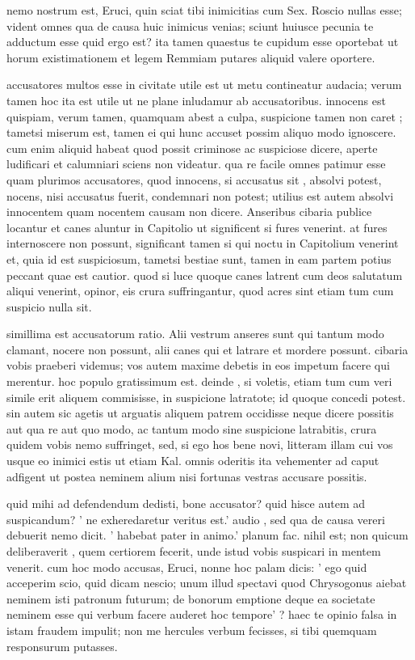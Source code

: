  nemo nostrum est, Eruci, quin sciat tibi inimicitias cum Sex. Roscio nullas esse; vident omnes qua de causa huic inimicus venias; sciunt huiusce pecunia te adductum esse quid ergo est? ita tamen quaestus te cupidum esse oportebat ut horum existimationem et legem Remmiam putares aliquid valere oportere.

 accusatores multos esse in civitate utile est ut metu contineatur audacia; verum tamen hoc ita est utile ut ne plane inludamur ab accusatoribus. innocens est quispiam, verum tamen, quamquam abest a culpa, suspicione tamen non caret ; tametsi miserum est, tamen ei qui hunc accuset possim aliquo modo ignoscere. cum enim aliquid habeat quod possit criminose ac suspiciose dicere, aperte ludificari et calumniari sciens non videatur. qua re facile omnes patimur esse quam plurimos accusatores, quod innocens, si accusatus sit , absolvi potest, nocens, nisi accusatus fuerit, condemnari non potest; utilius est autem absolvi innocentem quam nocentem causam non dicere. Anseribus cibaria publice locantur et canes aluntur in Capitolio ut significent si fures venerint. at fures internoscere non possunt, significant tamen si qui noctu in Capitolium venerint et, quia id est suspiciosum, tametsi bestiae sunt, tamen in eam partem potius peccant quae est cautior. quod si luce quoque canes latrent cum deos salutatum aliqui venerint, opinor, eis crura suffringantur, quod acres sint etiam tum cum suspicio nulla sit.

 simillima est accusatorum ratio. Alii vestrum anseres sunt qui tantum modo clamant, nocere non possunt, alii canes qui et latrare et mordere possunt. cibaria vobis praeberi videmus; vos autem maxime debetis in eos impetum facere qui merentur. hoc populo gratissimum est. deinde , si voletis, etiam tum cum veri simile erit aliquem commisisse, in suspicione latratote; id quoque concedi potest. sin autem sic agetis ut arguatis aliquem patrem occidisse neque dicere possitis aut qua re aut quo modo, ac tantum modo sine suspicione latrabitis, crura quidem vobis nemo suffringet, sed, si ego hos bene novi, litteram illam cui vos usque eo inimici estis ut etiam Kal. omnis oderitis ita vehementer ad caput adfigent ut postea neminem alium nisi fortunas vestras accusare possitis.

 quid mihi ad defendendum dedisti, bone accusator? quid hisce autem ad suspicandum? ' ne exheredaretur veritus est.' audio , sed qua de causa vereri debuerit nemo dicit. ' habebat pater in animo.' planum fac. nihil est; non quicum deliberaverit , quem certiorem fecerit, unde istud vobis suspicari in mentem venerit. cum hoc modo accusas, Eruci, nonne hoc palam dicis: ' ego quid acceperim scio, quid dicam nescio; unum illud spectavi quod Chrysogonus aiebat neminem isti patronum futurum; de bonorum emptione deque ea societate neminem esse qui verbum facere auderet hoc tempore' ? haec te opinio falsa in istam fraudem impulit; non me hercules verbum fecisses, si tibi quemquam responsurum putasses.

